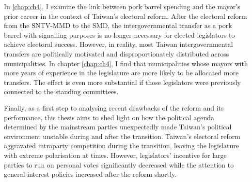 In \autoref{chap:ch4}, I examine the link between pork barrel spending and the mayor's prior career in the context of Taiwan's electoral reform. After the electoral reform from the SNTV-MMD to the SMD, the intergovernmental transfer as a pork barrel with signalling purposes is no longer necessary for elected legislators to achieve electoral success. However, in reality, most Taiwan intergovernmental transfers are politically motivated and disproportionately distributed across municipalities. In chapter \ref{chap:ch4}, I find that municipalities whose mayors with more years of experience in the legislature are more likely to be allocated more transfers. The effect is even more substantial if those legislators were previously connected to the standing committees. 

Finally, as a first step to analysing recent drawbacks of the reform and its performance, this thesis aims to shed light on how the political agenda determined by the mainstream parties unexpectedly made Taiwan's political environment unstable during and after the transition. Taiwan's electoral reform aggravated intraparty competition during the transition, leaving the legislature with extreme polarisation at times. However, legislators' incentive for large parties to run on personal votes significantly decreased while the attention to general interest policies increased after the reform shortly. 


